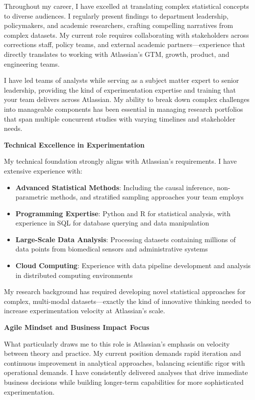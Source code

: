 \documentclass[10.5pt, letterpaper]{russell}
\begin{document}
\begin{cvletter}
  Throughout my career, I have excelled at translating complex statistical concepts to diverse audiences. I regularly present findings to department leadership, policymakers, and academic researchers, crafting compelling narratives from complex datasets. My current role requires collaborating with stakeholders across corrections staff, policy teams, and external academic partners—experience that directly translates to working with Atlassian's GTM, growth, product, and engineering teams.

  I have led teams of analysts while serving as a subject matter expert to senior leadership, providing the kind of experimentation expertise and training that your team delivers across Atlassian. My ability to break down complex challenges into manageable components has been essential in managing research portfolios that span multiple concurrent studies with varying timelines and stakeholder needs.

  \textbf{Technical Excellence in Experimentation}

  My technical foundation strongly aligns with Atlassian's requirements. I have extensive experience with:

  \begin{itemize}
    \item \textbf{Advanced Statistical Methods}: Including the causal inference, non-parametric methods, and stratified sampling approaches your team employs
    \item \textbf{Programming Expertise}: Python and R for statistical analysis, with experience in SQL for database querying and data manipulation
    \item \textbf{Large-Scale Data Analysis}: Processing datasets containing millions of data points from biomedical sensors and administrative systems
    \item \textbf{Cloud Computing}: Experience with data pipeline development and analysis in distributed computing environments
  \end{itemize}

  My research background has required developing novel statistical approaches for complex, multi-modal datasets—exactly the kind of innovative thinking needed to increase experimentation velocity at Atlassian's scale.

  \textbf{Agile Mindset and Business Impact Focus}

  What particularly draws me to this role is Atlassian's emphasis on velocity between theory and practice. My current position demands rapid iteration and continuous improvement in analytical approaches, balancing scientific rigor with operational demands. I have consistently delivered analyses that drive immediate business decisions while building longer-term capabilities for more sophisticated experimentation.


\end{cvletter}
\end{document}
